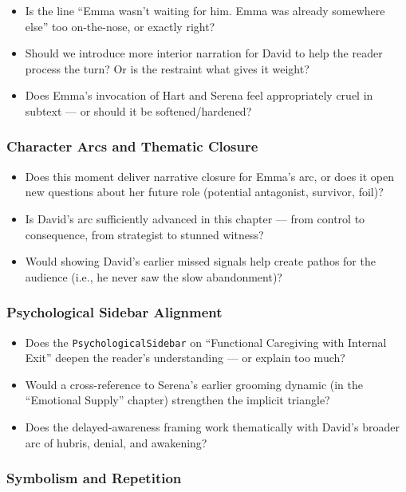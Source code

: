\begin{itemize}
  \item Is the line ``Emma wasn’t waiting for him. Emma was already somewhere else'' too on-the-nose, or exactly right?
  \item Should we introduce more interior narration for David to help the reader process the turn? Or is the restraint what gives it weight?
  \item Does Emma’s invocation of Hart and Serena feel appropriately cruel in subtext — or should it be softened/hardened?
\end{itemize}

\subsubsection*{Character Arcs and Thematic Closure}

\begin{itemize}
  \item Does this moment deliver narrative closure for Emma’s arc, or does it open new questions about her future role (potential antagonist, survivor, foil)?
  \item Is David’s arc sufficiently advanced in this chapter — from control to consequence, from strategist to stunned witness?
  \item Would showing David's earlier missed signals help create pathos for the audience (i.e., he never saw the slow abandonment)?
\end{itemize}

\subsubsection*{Psychological Sidebar Alignment}

\begin{itemize}
  \item Does the \texttt{PsychologicalSidebar} on “Functional Caregiving with Internal Exit” deepen the reader’s understanding — or explain too much?
  \item Would a cross-reference to Serena's earlier grooming dynamic (in the ``Emotional Supply'' chapter) strengthen the implicit triangle?
  \item Does the delayed-awareness framing work thematically with David’s broader arc of hubris, denial, and awakening?
\end{itemize}

\subsubsection*{Symbolism and Repetition}

